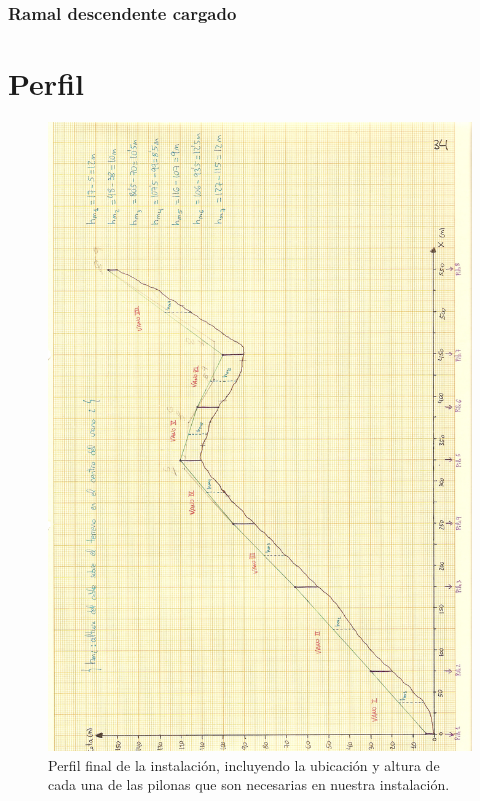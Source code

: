 \documentclass[a4paper,11pt]{article}
\begin{document}
\section{Ramal descendente cargado}
\part{Perfil}
\begin{figure}[h]
\raggedright
\includegraphics[scale=.8]{Perfil.jpg}
\caption{Perfil final de la instalación, incluyendo la ubicación y altura de cada una de las pilonas que son necesarias en nuestra instalación.}
\label{perfil}
\end{figure}
\end{document}
